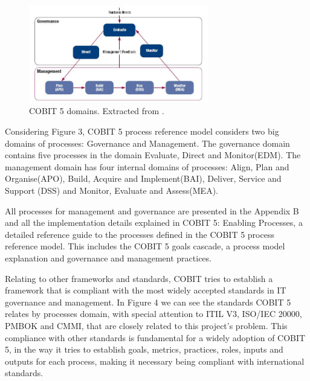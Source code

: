 \begin{figure}
\centering
\includegraphics[width=0.7\textwidth]{img/COBITProcesses.jpg}
\caption{COBIT 5 domains. Extracted from \cite{2012cobit}.}
\end{figure}

Considering Figure 3, COBIT 5 process reference model considers two big domains of processes: Governance and Management. The governance domain contains five processes in the domain Evaluate, Direct and Monitor(EDM). The management domain has four internal domains of processes: Align, Plan and Organise(APO), Build, Acquire and Implement(BAI), Deliver, Service and Support (DSS) and Monitor, Evaluate and Assess(MEA).\par
All processes for management and governance are presented in the Appendix B and all the implementation details explained in COBIT 5: Enabling Processes\cite{2012cobitEP}, a detailed reference guide to the processes defined in the COBIT 5 process reference model. This includes the COBIT 5 goals cascade, a process model explanation and governance and management practices.\par
Relating to other frameworks and standards, COBIT tries to establish a framework that is compliant with the most widely accepted standards in IT governance and management. In Figure 4 we can see the standards COBIT 5 relates by processes domain, with special attention to ITIL V3\cite{itilSS,itilSD,itilSO,itilST,itilCSI}, ISO/IEC 20000\cite{ISO20000-1}, PMBOK\cite{pmbok5} and CMMI\cite{cmmi}, that are closely related to this project's problem. This compliance with other standards is fundamental for a widely adoption of COBIT 5, in the way it tries to establish goals, metrics, practices, roles, inputs and outputs for each process, making it necessary being compliant with international standards.\par

